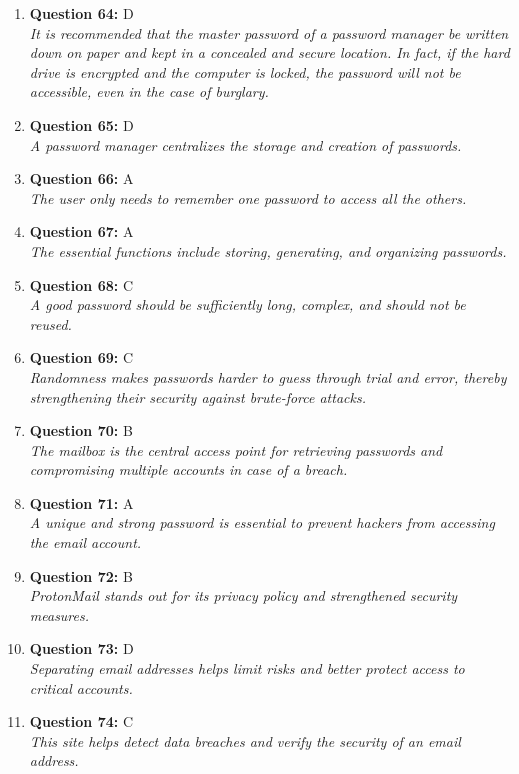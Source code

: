 \documentclass[12pt,a4paper]{article}
\begin{document}
\begin{enumerate}
\item \textbf{Question 64:} D
\\ \textit{It is recommended that the master password of a password manager be written down on paper and kept in a concealed and secure location. In fact, if the hard drive is encrypted and the computer is locked, the password will not be accessible, even in the case of burglary.}

\item \textbf{Question 65:} D
\\ \textit{A password manager centralizes the storage and creation of passwords.}

\item \textbf{Question 66:} A
\\ \textit{The user only needs to remember one password to access all the others.}

\item \textbf{Question 67:} A
\\ \textit{The essential functions include storing, generating, and organizing passwords.}

\item \textbf{Question 68:} C
\\ \textit{A good password should be sufficiently long, complex, and should not be reused.}

\item \textbf{Question 69:} C
\\ \textit{Randomness makes passwords harder to guess through trial and error, thereby strengthening their security against brute-force attacks.}

\item \textbf{Question 70:} B
\\ \textit{The mailbox is the central access point for retrieving passwords and compromising multiple accounts in case of a breach.}

\item \textbf{Question 71:} A
\\ \textit{A unique and strong password is essential to prevent hackers from accessing the email account.}

\item \textbf{Question 72:} B
\\ \textit{ProtonMail stands out for its privacy policy and strengthened security measures.}

\item \textbf{Question 73:} D
\\ \textit{Separating email addresses helps limit risks and better protect access to critical accounts.}

\item \textbf{Question 74:} C
\\ \textit{This site helps detect data breaches and verify the security of an email address.}


\end{enumerate}
\end{document}
